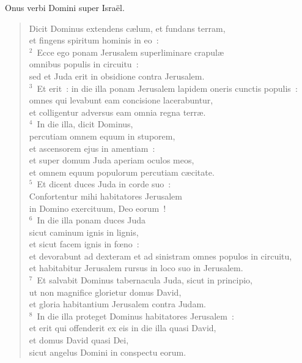 \bchapter
\lettrine[lines=3,image=true,loversize=0.05,lraise=-0.03]{O}{}nus verbi Domini super Isra\"el. \begin{flushleft}\begin{verse}\vspace{6pt}Dicit Dominus extendens c\ae lum, et fundans terram,\\ et fingens spiritum hominis in eo~:\\
${}^{2}$~Ecce ego ponam Jerusalem superliminare crapul\ae \\ omnibus populis in circuitu~:\\ sed et Juda erit in obsidione contra Jerusalem.\\
${}^{3}$~Et erit~: in die illa ponam Jerusalem lapidem oneris cunctis populis~:\\ omnes qui levabunt eam concisione lacerabuntur,\\ et colligentur adversus eam omnia regna terr\ae .\\
${}^{4}$~In die illa, dicit Dominus,\\ percutiam omnem equum in stuporem,\\ et ascensorem ejus in amentiam~:\\ et super domum Juda aperiam oculos meos,\\ et omnem equum populorum percutiam c\ae citate.\\
${}^{5}$~Et dicent duces Juda in corde suo~:\\ Confortentur mihi habitatores Jerusalem\\ in Domino exercituum, Deo eorum~!\\
${}^{6}$~In die illa ponam duces Juda\\ sicut caminum ignis in lignis,\\ et sicut facem ignis in fœno~:\\ et devorabunt ad dexteram et ad sinistram omnes populos in circuitu,\\ et habitabitur Jerusalem rursus in loco suo in Jerusalem.\\
${}^{7}$~Et salvabit Dominus tabernacula Juda, sicut in principio,\\ ut non magnifice glorietur domus David,\\ et gloria habitantium Jerusalem contra Judam.\\
${}^{8}$~In die illa proteget Dominus habitatores Jerusalem~:\\ et erit qui offenderit ex eis in die illa quasi David,\\ et domus David quasi Dei,\\ sicut angelus Domini in conspectu eorum.\end{verse}\end{flushleft}


